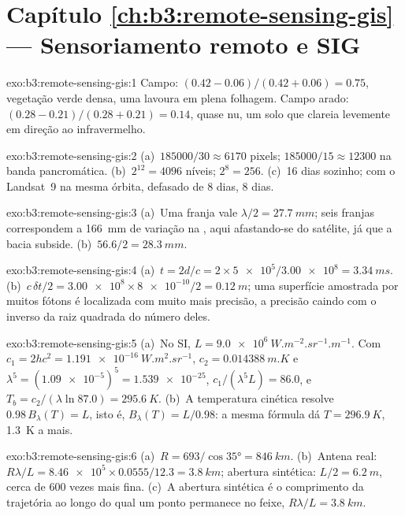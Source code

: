 \section*{Capítulo \ref{ch:b3:remote-sensing-gis} --- Sensoriamento remoto e SIG}

\begin{solution}{exo:b3:remote-sensing-gis:1}
Campo: $(0.42 - 0.06)/(0.42 + 0.06) = 0.75$, vegetação verde densa, uma lavoura
em plena folhagem. Campo arado: $(0.28 - 0.21)/(0.28 + 0.21) = 0.14$, quase nu,
um solo que clareia levemente em direção ao infravermelho.
\end{solution}

\begin{solution}{exo:b3:remote-sensing-gis:2}
(a)~$185000/30 \approx 6170$ pixels; $185000/15 \approx 12300$ na
banda pancromática. (b)~$2^{12} = 4096$ níveis; $2^8 = 256$. (c)~16 dias
sozinho; com o Landsat~9 na mesma órbita, defasado de 8 dias, 8 dias.
\end{solution}

\begin{solution}{exo:b3:remote-sensing-gis:3}
(a)~Uma franja vale $\lambda/2 = \qty{27.7}{mm}$; seis franjas
correspondem a \qty{166}{mm} de variação na , aqui afastando-se do satélite, já que a bacia subside. 
(b)~$56.6/2 = \qty{28.3}{mm}$.
\end{solution}

\begin{solution}{exo:b3:remote-sensing-gis:4}
(a)~$t = 2d/c = 2\times\num{5e5}/\num{3.00e8} = \qty{3.34}{ms}$.
(b)~$c\,\delta t/2 = \num{3.00e8}\times\num{8e-10}/2 = \qty{0.12}{m}$; uma
superfície amostrada por muitos fótons é localizada com muito mais precisão, a
precisão caindo com o inverso da raiz quadrada do número deles.
\end{solution}

\begin{solution}{exo:b3:remote-sensing-gis:5}
(a)~No SI, $L = \qty{9.0e6}{W.m^{-2}.sr^{-1}.m^{-1}}$. Com $c_1 =
2hc^2 = \qty{1.191e-16}{W.m^2.sr^{-1}}$, $c_2 = \qty{0.014388}{m.K}$ e
$\lambda^5 = (\num{1.09e-5})^5 = \num{1.539e-25}$, $c_1/(\lambda^5L) = 86.0$,
e $T_b = c_2/(\lambda\ln 87.0) = \qty{295.6}{K}$. (b)~A temperatura cinética
resolve $0.98\,B_\lambda(T) = L$, isto é, $B_\lambda(T) = L/0.98$: a mesma
fórmula dá $T = \qty{296.9}{K}$, \qty{1.3}{K} a mais.
\end{solution}

\begin{solution}{exo:b3:remote-sensing-gis:6}
(a)~$R = 693/\cos\ang{35} = \qty{846}{km}$. (b)~Antena real: $R\lambda/L =
\num{8.46e5}\times0.0555/12.3 = \qty{3.8}{km}$; abertura sintética: $L/2 =
\qty{6.2}{m}$, cerca de 600 vezes mais fina. (c)~A abertura sintética é o
comprimento da trajetória ao longo do qual um ponto permanece no feixe, $R\lambda/L =
\qty{3.8}{km}$.
\end{solution}

